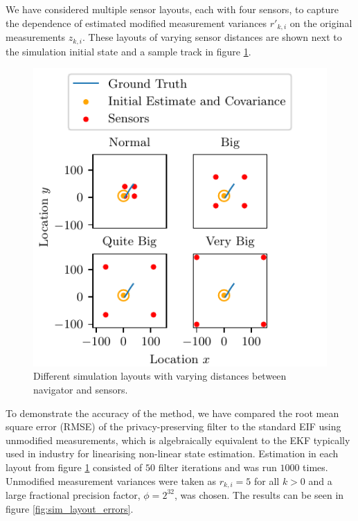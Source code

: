 \documentclass[10pt,letterpaper,oneside,twocolumn,journal]{IEEEtran}
\theoremstyle{definition}
\theoremstyle{definition}
\theoremstyle{remark}
\begin{document}
We have considered multiple sensor layouts, each with four sensors, to capture the dependence of estimated modified measurement variances $r'_{k,i}$ on the original measurements $z_{k,i}$. These layouts of varying sensor distances are shown next to the simulation initial state and a sample track in figure \ref{fig:sim_layouts}.
\begin{figure}[htbp]
    \centering
    \includegraphics{images/layouts.pdf}
    \caption{Different simulation layouts with varying distances between navigator and sensors.}
    \label{fig:sim_layouts}
\end{figure}
To demonstrate the accuracy of the method, we have compared the root mean square error (RMSE) of the privacy-preserving filter to the standard EIF using unmodified measurements, which is algebraically equivalent to the EKF typically used in industry for linearising non-linear state estimation. Estimation in each layout from figure \ref{fig:sim_layouts} consisted of $50$ filter iterations and was run $1000$ times. Unmodified measurement variances were taken as $r_{k,i}=5$ for all $k>0$ and a large fractional precision factor, $\phi=2^{32}$, was chosen. The results can be seen in figure \ref{fig:sim_layout_errors}.
\end{document}
